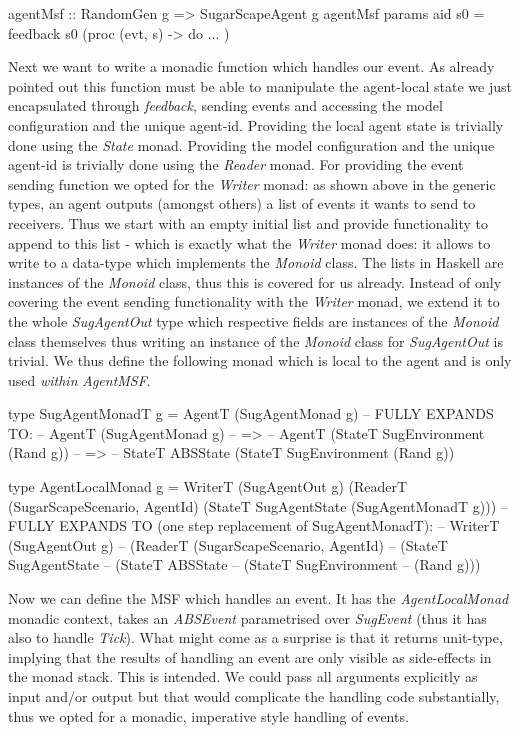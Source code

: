 \begin{HaskellCode}
agentMsf :: RandomGen g => SugarScapeAgent g
agentMsf params aid s0 = feedback s0 (proc (evt, s) -> do ... )
\end{HaskellCode}

Next we want to write a monadic function which handles our event. As already pointed out this function must be able to manipulate the agent-local state we just encapsulated through \textit{feedback}, sending events and accessing the model configuration and the unique agent-id. Providing the local agent state is trivially done using the \textit{State} monad. Providing the model configuration and the unique agent-id is trivially done using the \textit{Reader} monad. For providing the event sending function we opted for the \textit{Writer} monad: as shown above in the generic types, an agent outputs (amongst others) a list of events it wants to send to receivers. Thus we start with an empty initial list and provide functionality to append to this list - which is exactly what the \textit{Writer} monad does: it allows to write to a data-type which implements the \textit{Monoid} class. The lists in Haskell are instances of the \textit{Monoid} class, thus this is covered for us already. Instead of only covering the event sending functionality with the \textit{Writer} monad, we extend it to the whole \textit{SugAgentOut} type which respective fields are instances of the \textit{Monoid} class themselves thus writing an instance of the \textit{Monoid} class for \textit{SugAgentOut} is trivial. We thus define the following monad which is local to the agent and is only used \textit{within} \textit{AgentMSF}.

\begin{HaskellCode}
type SugAgentMonadT g = AgentT (SugAgentMonad g)
-- FULLY EXPANDS TO:
-- AgentT (SugAgentMonad g)
--  =>
-- AgentT (StateT SugEnvironment (Rand g))
--  =>
-- StateT ABSState (StateT SugEnvironment (Rand g))

type AgentLocalMonad g = WriterT (SugAgentOut g) 
                           (ReaderT (SugarScapeScenario, AgentId) 
                             (StateT SugAgentState (SugAgentMonadT g)))
-- FULLY EXPANDS TO (one step replacement of SugAgentMonadT):
-- WriterT (SugAgentOut g) 
--  (ReaderT (SugarScapeScenario, AgentId) 
--    (StateT SugAgentState 
--      (StateT ABSState 
--        (StateT SugEnvironment 
--          (Rand g)))  
\end{HaskellCode}

Now we can define the MSF which handles an event. It has the \textit{AgentLocalMonad} monadic context, takes an \textit{ABSEvent} parametrised over \textit{SugEvent} (thus it has also to handle \textit{Tick}). What might come as a surprise is that it returns unit-type, implying that the results of handling an event are only visible as side-effects in the monad stack. This is intended. We could pass all arguments explicitly as input and/or output but that would complicate the handling code substantially, thus we opted for a monadic, imperative style handling of events.

